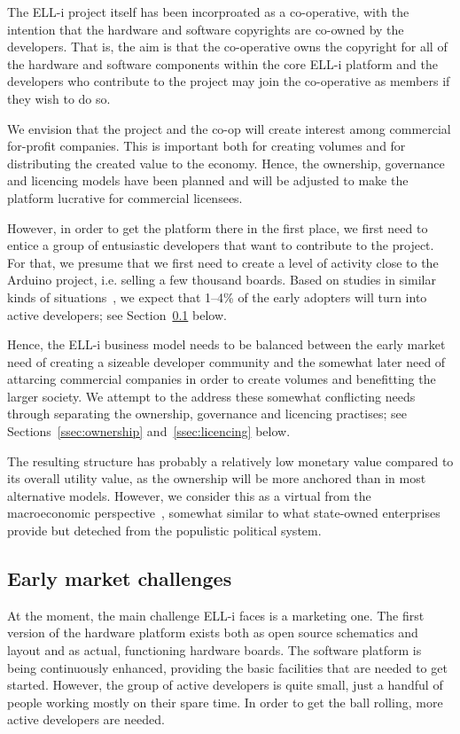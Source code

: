 \documentclass[draft,a4paper]{siamltex}
\begin{document}
The ELL-i project itself has been incorproated as a co-operative, with
the intention that the hardware and software copyrights are co-owned
by the developers.  That is, the aim is that the co-operative owns the
copyright for all of the hardware and software components within the
core ELL-i platform and the developers who contribute to the project
may join the co-operative as members if they wish to do so.

We envision that the project and the co-op will create interest among
commercial for-profit companies.  This is important both for creating
volumes and for distributing the created value to the economy.
Hence, the ownership, governance and licencing models have been
planned and will be adjusted to make the platform lucrative for
commercial licensees.

However, in order to get the platform there in the first place, we
first need to entice a group of entusiastic developers that want to
contribute to the project.  For that, we presume that we first need to
create a level of activity close to the Arduino project, i.e. selling
a few thousand boards.  Based on studies in similar kinds of
situations~\cite{need-reference}, we expect that 1--4\% of the early
adopters will turn into active developers; see
Section~\ref{ssec:earlymarket} below.

Hence, the ELL-i business model needs to be balanced between the early
market need of creating a sizeable developer community and the
somewhat later need of attarcing commercial companies in order to
create volumes and benefitting the larger society.  We attempt to the
address these somewhat conflicting needs through separating the
ownership, governance and licencing practises; see
Sections~\ref{ssec:ownership} and~\ref{ssec:licencing} below.

The resulting structure has probably a relatively low monetary value
compared to its overall utility value, as the ownership will be more
anchored than in most alternative models.  However, we consider this
as a virtual from the macroeconomic
perspective~\cite{Olson2002}, somewhat similar to what
state-owned enterprises provide but deteched from the populistic
political system.

\subsection{Early market challenges}
\label{ssec:earlymarket}

At the moment, the main challenge ELL-i faces is a marketing one.  The
first version of the hardware platform exists both as open source
schematics and layout and as actual, functioning hardware boards.  The
software platform is being continuously enhanced, providing the basic
facilities that are needed to get started.  However, the group of
active developers is quite small, just a handful of people working
mostly on their spare time.  In order to get the ball rolling, more
active developers are needed.
\end{document}
